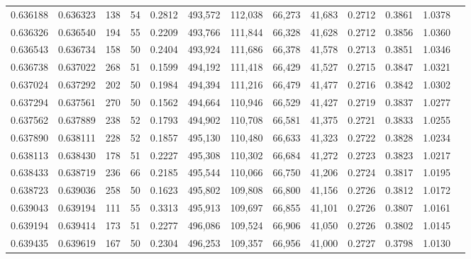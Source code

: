 \begin{tabular}{rrrrrrrrrrrrr}
0.636188 & 0.636323 &   138 &  54 &                                     0.2812 & 493,572 & 112,038 &  66,273 &  41,683 & 0.2712 & 0.3861 & 1.0378 \\
0.636326 & 0.636540 &   194 &  55 &                                     0.2209 & 493,766 & 111,844 &  66,328 &  41,628 & 0.2712 & 0.3856 & 1.0360 \\
0.636543 & 0.636734 &   158 &  50 &                                     0.2404 & 493,924 & 111,686 &  66,378 &  41,578 & 0.2713 & 0.3851 & 1.0346 \\
0.636738 & 0.637022 &   268 &  51 &                                     0.1599 & 494,192 & 111,418 &  66,429 &  41,527 & 0.2715 & 0.3847 & 1.0321 \\
0.637024 & 0.637292 &   202 &  50 &                                     0.1984 & 494,394 & 111,216 &  66,479 &  41,477 & 0.2716 & 0.3842 & 1.0302 \\
0.637294 & 0.637561 &   270 &  50 &                                     0.1562 & 494,664 & 110,946 &  66,529 &  41,427 & 0.2719 & 0.3837 & 1.0277 \\
0.637562 & 0.637889 &   238 &  52 &                                     0.1793 & 494,902 & 110,708 &  66,581 &  41,375 & 0.2721 & 0.3833 & 1.0255 \\
0.637890 & 0.638111 &   228 &  52 &                                     0.1857 & 495,130 & 110,480 &  66,633 &  41,323 & 0.2722 & 0.3828 & 1.0234 \\
0.638113 & 0.638430 &   178 &  51 &                                     0.2227 & 495,308 & 110,302 &  66,684 &  41,272 & 0.2723 & 0.3823 & 1.0217 \\
0.638433 & 0.638719 &   236 &  66 &                                     0.2185 & 495,544 & 110,066 &  66,750 &  41,206 & 0.2724 & 0.3817 & 1.0195 \\
0.638723 & 0.639036 &   258 &  50 &                                     0.1623 & 495,802 & 109,808 &  66,800 &  41,156 & 0.2726 & 0.3812 & 1.0172 \\
0.639043 & 0.639194 &   111 &  55 &                                     0.3313 & 495,913 & 109,697 &  66,855 &  41,101 & 0.2726 & 0.3807 & 1.0161 \\
0.639194 & 0.639414 &   173 &  51 &                                     0.2277 & 496,086 & 109,524 &  66,906 &  41,050 & 0.2726 & 0.3802 & 1.0145 \\
0.639435 & 0.639619 &   167 &  50 &                                     0.2304 & 496,253 & 109,357 &  66,956 &  41,000 & 0.2727 & 0.3798 & 1.0130 \\

\end{tabular}
